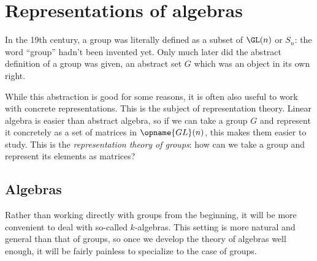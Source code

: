 \chapter{Representations of algebras}
In the 19th century, a group was literally defined
as a subset of $\GL(n)$ or $S_n$: the word ``group'' hadn't been invented yet.
Only much later did the abstract definition of a group was given,
an abstract set $G$ which was an object in its own right.

While this abstraction is good for some reasons,
it is often also useful to work with concrete representations.
This is the subject of representation theory.
Linear algebra is easier than abstract algebra,
so if we can take a group $G$ and represent it concretely
as a set of matrices in $\opname{GL}(n)$,
this makes them easier to study.
This is the \emph{representation theory of groups}:
how can we take a group and represent its elements as matrices?

\section{Algebras}
Rather than working directly with groups from the beginning,
it will be more convenient to deal with so-called $k$-algebras.
This setting is more natural and general than that of groups,
so once we develop the theory of algebras well enough,
it will be fairly painless to specialize to the case of groups.


